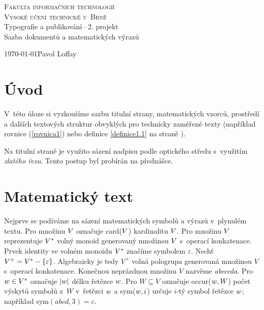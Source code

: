 \documentclass[11pt,a4paper,titlepage,twocolumn]{article}
\theoremstyle{definition}
\begin{document}
\begin{titlepage}
	\begin{center}
		{\Large \textsc{Fakulta informačních technologií}}\\
		{\Large \textsc{Vysoké učení technické v~Brně}}\\
		\bigskip
		{\LARGE Typografie a publikování\,--\,2. projekt\\}
		\medskip
		{\Huge Sazba dokumentů a matematických výrazů}
	\end{center}
	\Large{\today \hfill Pavol Loffay}
	\bigskip
\end{titlepage}

\section*{Úvod} 
	V~této úloze si vyzkoušíme sazbu titulní strany, matematických vzorců, prostředí a dalších 
	textových struktur obvyklých pro technicky zaměřené texty 
	(například rovnice (\ref{rovnica1}) nebo definice \ref{definice1.1} na straně \pageref{definice1.1}).

	Na titulní straně je využito sázení nadpisu podle optického středu s~využitím \emph{zlatého řezu}. 
	Tento postup byl probírán na přednášce.

\section{Matematický text}
	Nejprve se podíváme na sázení matematických symbolů a výrazů v~plynulém textu. 
	Pro množinu \begin{math} \mathnormal{V} \end{math} označuje card($\mathnormal{V}$) 
	kardinalitu $\mathnormal{V}$.
	Pro množinu $\mathnormal{V}$ reprezentuje $\mathnormal{V}^*$ volný monoid generovaný 
	množinou $\mathnormal{V}$ s~operací konkatenace. 
	Prvek identity ve volném monoidu $\mathnormal{V}^*$ značíme symbolem $\varepsilon$.
	Nechť $\mathnormal{V^+=V^* -\{\varepsilon\}}$. Algebraicky je tedy $V^+$ volná pologrupa 
	generovaná množinou $V$ s~operací konkatenace. Konečnou neprázdnou množinu $V$ nazvěme \emph{abeceda}. 
	Pro $\mathnormal{w} \in V^*$ označuje $|\mathnormal{w}|$ délku řetězce $\mathnormal{w}$. 
	Pro $W\subseteq V$ označuje occur($\mathnormal{w},W$) počet výskytů symbolů z~$W$
	v~řetězci $\mathnormal{w}$ a sym($\mathnormal{w},i$) 
	určuje $i$-tý symbol řetězce $\mathnormal{w}$; například sym$(abcd,3)=c$.
\end{document}
